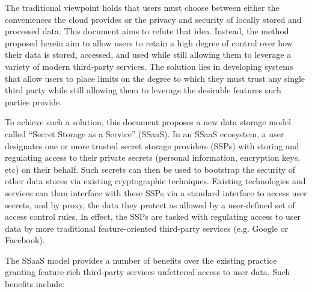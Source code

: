 The traditional viewpoint holds that users must choose between either
the conveniences the cloud provides or the privacy and security of
locally stored and processed data. This document aims to refute that
idea. Instead, the method proposed herein aim to allow users to retain
a high degree of control over how their data is stored, accessed, and
used while still allowing them to leverage a variety of modern
third-party services. The solution lies in developing systems that
allow users to place limits on the degree to which they must trust any
single third party while still allowing them to leverage the desirable
features such parties provide.

To achieve such a solution, this document proposes a new data storage
model called ``Secret Storage as a Service'' (SSaaS). In an SSaaS
ecosystem, a user designates one or more trusted secret storage
providers (SSPs) with storing and regulating access to their private
secrets (personal information, encryption keys, etc) on their
behalf. Such secrets can then be used to bootstrap the security of
other data stores via existing cryptographic techniques. Existing
technologies and services can than interface with these SSPs via a
standard interface to access user secrets, and by proxy, the data they
protect as allowed by a user-defined set of access control rules. In
effect, the SSPs are tasked with regulating access to user data by
more traditional feature-oriented third-party services (e.g. Google or
Facebook).

The SSaaS model provides a number of benefits over the existing
practice granting feature-rich third-party services unfettered access
to user data. Such benefits include:

